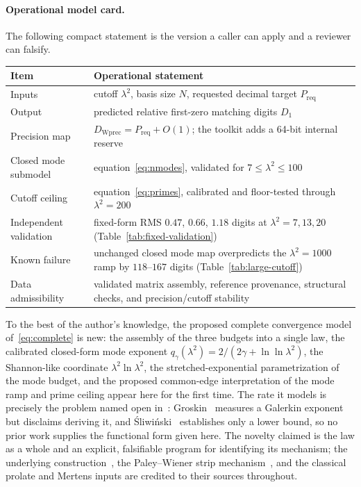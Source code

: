 \documentclass[11pt,a4paper]{article}
\begin{document}
\paragraph{Operational model card.}
The following compact statement is the version a caller can apply and a
reviewer can falsify.
\begin{center}
\small
\begin{tabular}{@{}p{}p{}@{}}
\toprule
Item & Operational statement \\
\midrule
Inputs & cutoff $\lambda^2$, basis size $N$, requested decimal target
$P_{\mathrm{req}}$ \\
Output & predicted relative first-zero matching digits $D_1$ \\
Precision map & $D_{\mathrm{Wprec}}=P_{\mathrm{req}}+O(1)$; the toolkit adds a
64-bit internal reserve \\
Closed mode submodel & equation~\eqref{eq:nmodes}, validated for
$7\le\lambda^2\le100$ \\
Cutoff ceiling & equation~\eqref{eq:primes}, calibrated and floor-tested
through $\lambda^2=200$ \\
Independent validation & fixed-form RMS $0.47$, $0.66$, $1.18$ digits at
$\lambda^2=7,13,20$ (Table~\ref{tab:fixed-validation}) \\
Known failure & unchanged closed mode map overpredicts the
$\lambda^2=1000$ ramp by $118$--$167$ digits (Table~\ref{tab:large-cutoff}) \\
Data admissibility & validated matrix assembly, reference provenance,
structural checks, and precision/cutoff stability \\
\bottomrule
\end{tabular}
\end{center}

To the best of the author's knowledge, the proposed complete convergence model
of~\eqref{eq:complete} is new: the assembly of the three budgets into a
single law, the calibrated closed-form mode exponent
$q_\gamma(\lambda^2)=2/(2\gamma+\ln\ln\lambda^2)$, the Shannon-like coordinate
$\lambda^2\ln\lambda^2$, the stretched-exponential parametrization of the mode
budget, and the proposed common-edge interpretation of the mode ramp and prime
ceiling appear here for the first time. The rate it models is precisely the
problem named open in~\cite{CCM2025}: Groskin~\cite{Groskin2026} measures a
Galerkin exponent but disclaims deriving it, and \'Sliwi\'nski~\cite{Sliwinski2026}
establishes only a lower bound, so no prior work supplies the functional form
given here. The novelty claimed is the law as a whole and an explicit,
falsifiable program for identifying its mechanism; the underlying
construction~\cite{CCM2025,CvS2025}, the
Paley--Wiener strip mechanism~\cite{Groskin2026}, and the classical prolate and
Mertens inputs are credited to their sources throughout.
\end{document}
